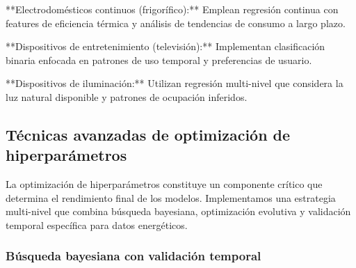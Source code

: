 **Electrodomésticos continuos (frigorífico):** Emplean regresión continua con features de eficiencia térmica y análisis de tendencias de consumo a largo plazo.

**Dispositivos de entretenimiento (televisión):** Implementan clasificación binaria enfocada en patrones de uso temporal y preferencias de usuario.

**Dispositivos de iluminación:** Utilizan regresión multi-nivel que considera la luz natural disponible y patrones de ocupación inferidos.

\subsection{Técnicas avanzadas de optimización de hiperparámetros}

La optimización de hiperparámetros constituye un componente crítico que determina el rendimiento final de los modelos. Implementamos una estrategia multi-nivel que combina búsqueda bayesiana, optimización evolutiva y validación temporal específica para datos energéticos.

\subsubsection{Búsqueda bayesiana con validación temporal}

